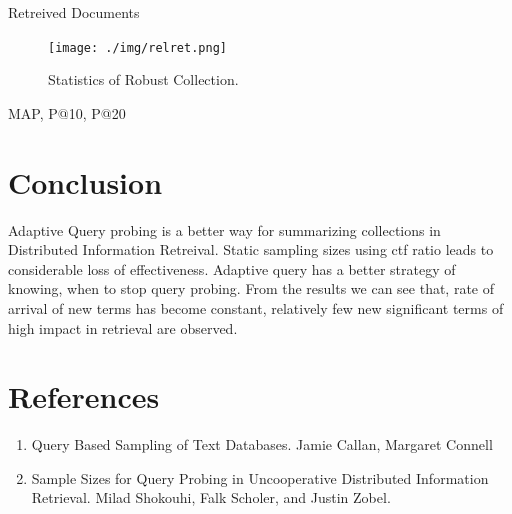 \documentclass[paper=a4, fontsize=11pt,twoside]{scrartcl}	%
\begin{document}
Retreived Documents 


\begin{figure}[H]
\centering
\texttt{[image: ./img/relret.png]}
\caption{\label{fig:3}Statistics of Robust Collection.}
\end{figure}



MAP, P@10, P@20


\section{Conclusion}
Adaptive Query probing is a better way for summarizing collections in Distributed Information Retreival. Static sampling sizes using ctf ratio leads to considerable loss of effectiveness. Adaptive query has a better strategy of knowing, when to stop query probing. From the results we can see that, rate of arrival of new terms has
become constant, relatively few new significant terms of high impact in retrieval are observed.



\section{References}

\begin{enumerate}
  \item Query Based Sampling of Text Databases. Jamie Callan, Margaret Connell 
  \item Sample Sizes for Query Probing in Uncooperative Distributed Information Retrieval. Milad Shokouhi, 
  Falk Scholer, and Justin Zobel. 
\end{enumerate}

\end{document}
